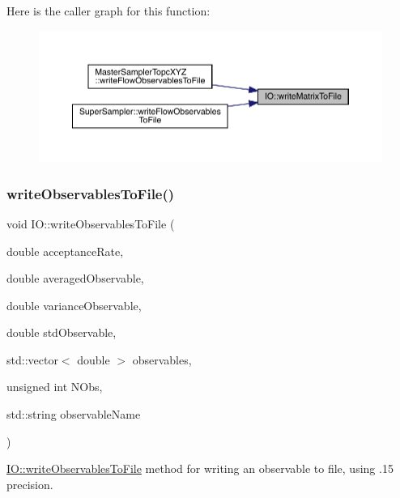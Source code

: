 Here is the caller graph for this function\+:\nopagebreak
\begin{figure}[H]
\begin{center}
\leavevmode
\includegraphics[width=350pt]{namespace_i_o_ad77b7dd770afc8e2eb433d6187ea3616_icgraph}
\end{center}
\end{figure}
\mbox{\label{namespace_i_o_ad8cf5aef8f60d10b80292b69a091d5ac}} 
\subsubsection{\texorpdfstring{writeObservablesToFile()}{writeObservablesToFile()}}
{\footnotesize\ttfamily void I\+O\+::write\+Observables\+To\+File (\begin{DoxyParamCaption}\item[{double}]{acceptance\+Rate,  }\item[{double}]{averaged\+Observable,  }\item[{double}]{variance\+Observable,  }\item[{double}]{std\+Observable,  }\item[{std\+::vector$<$ double $>$}]{observables,  }\item[{unsigned int}]{N\+Obs,  }\item[{std\+::string}]{observable\+Name }\end{DoxyParamCaption})}



\mbox{\hyperlink{namespace_i_o_ad8cf5aef8f60d10b80292b69a091d5ac}{I\+O\+::write\+Observables\+To\+File}} method for writing an observable to file, using .15 precision. 



